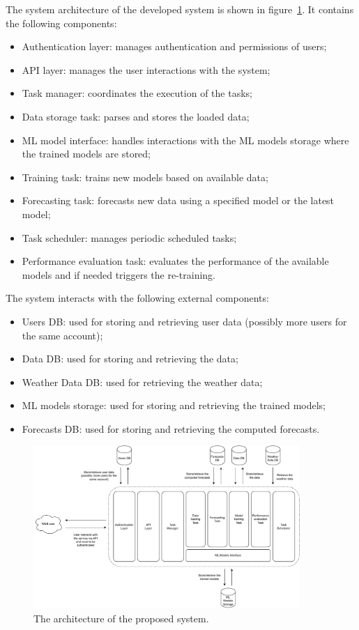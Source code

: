 
The system architecture of the developed system is shown in figure~\ref{fig:components}.
It contains the following components:
\begin{itemize}
  \item Authentication layer: manages authentication and permissions of users;
  \item API layer: manages the user interactions with the system;
  \item Task manager: coordinates the execution of the tasks;
  \item Data storage task: parses and stores the loaded data;
  \item ML model interface: handles interactions with the ML models storage where the trained models are stored;
  \item Training task: trains new models based on available data;
  \item Forecasting task: forecasts new data using a specified model or the latest model;
  \item Task scheduler: manages periodic scheduled tasks;
  \item Performance evaluation task: evaluates the performance of the available models and if needed triggers the re-training.
\end{itemize}

The system interacts with the following external components:
\begin{itemize}
  \item Users DB: used for storing and retrieving user data (possibly more users for the same account);
  \item Data DB: used for storing and retrieving the data;
  \item Weather Data DB: used for retrieving the weather data;
  \item ML models storage: used for storing and retrieving the trained models;
  \item Forecasts DB: used for storing and retrieving the computed forecasts.
\end{itemize}

\begin{figure}[H]
\centering
\includegraphics[width=0.9\textwidth]{images/architecture_components}
\caption{The architecture of the proposed system.}
\label{fig:components}
\end{figure}


